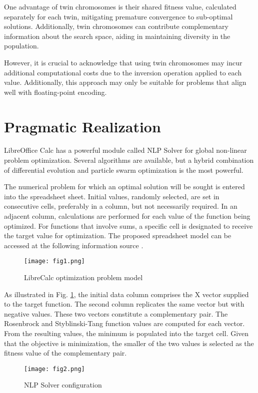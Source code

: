 \documentclass[runningheads]{llncs}
\begin{document}
One advantage of twin chromosomes is their shared fitness value, calculated separately for each twin, mitigating premature convergence to sub-optimal solutions. Additionally, twin chromosomes can contribute complementary information about the search space, aiding in maintaining diversity in the population.

However, it is crucial to acknowledge that using twin chromosomes may incur additional computational costs due to the inversion operation applied to each value. Additionally, this approach may only be suitable for problems that align well with floating-point encoding.

\section{Pragmatic Realization}

LibreOffice Calc has a powerful module called NLP Solver for global non-linear problem optimization. Several algorithms are available, but a hybrid combination of differential evolution and particle swarm optimization is the most powerful.

The numerical problem for which an optimal solution will be sought is entered into the spreadsheet sheet. Initial values, randomly selected, are set in consecutive cells, preferably in a column, but not necessarily required. In an adjacent column, calculations are performed for each value of the function being optimized. For functions that involve sums, a specific cell is designated to receive the target value for optimization. The proposed spreadsheet model can be accessed at the following information source \cite{Balabanov-2024}.

\begin{figure}
\texttt{[image: fig1.png]}
\caption{LibreCalc optimization problem model} \label{fig1}
\end{figure}

As illustrated in Fig. \ref{fig1}, the initial data column comprises the X vector supplied to the target function. The second column replicates the same vector but with negative values. These two vectors constitute a complementary pair. The Rosenbrock and Styblinski-Tang function values are computed for each vector. From the resulting values, the minimum is populated into the target cell. Given that the objective is minimization, the smaller of the two values is selected as the fitness value of the complementary pair.

\begin{figure}
\texttt{[image: fig2.png]}
\caption{NLP Solver configuration} \label{fig2}
\end{figure}
\end{document}
